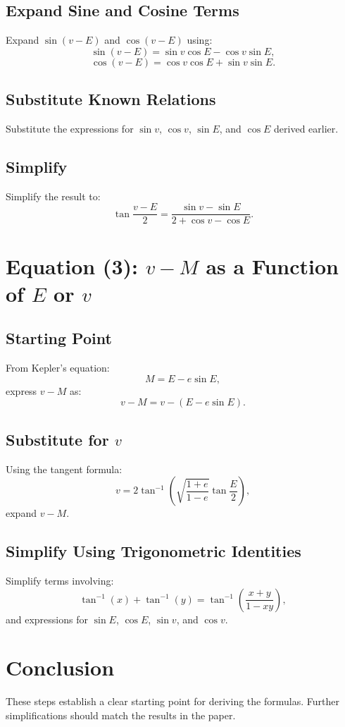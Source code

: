 \documentclass[11pt]{article}
\begin{document}
\subsection*{Expand Sine and Cosine Terms}
Expand \(\sin(v - E)\) and \(\cos(v - E)\) using:
\[
\sin(v - E) = \sin v \cos E - \cos v \sin E,
\]
\[
\cos(v - E) = \cos v \cos E + \sin v \sin E.
\]

\subsection*{Substitute Known Relations}
Substitute the expressions for \(\sin v\), \(\cos v\), \(\sin E\), and \(\cos E\) derived earlier.

\subsection*{Simplify}
Simplify the result to:
\[
\tan\frac{v - E}{2} = \frac{\sin v - \sin E}{2 + \cos v - \cos E}.
\]

\section*{Equation (3): \(v - M\) as a Function of \(E\) or \(v\)}
\subsection*{Starting Point}
From Kepler’s equation:
\[
M = E - e \sin E,
\]
express \(v - M\) as:
\[
v - M = v - (E - e \sin E).
\]

\subsection*{Substitute for \(v\)}
Using the tangent formula:
\[
v = 2 \tan^{-1}\left(\sqrt{\frac{1 + e}{1 - e}} \tan\frac{E}{2}\right),
\]
expand \(v - M\).

\subsection*{Simplify Using Trigonometric Identities}
Simplify terms involving:
\[
\tan^{-1}(x) + \tan^{-1}(y) = \tan^{-1}\left(\frac{x + y}{1 - xy}\right),
\]
and expressions for \(\sin E\), \(\cos E\), \(\sin v\), and \(\cos v\).

\section*{Conclusion}
These steps establish a clear starting point for deriving the formulas. Further simplifications should match the results in the paper.
\end{document}
